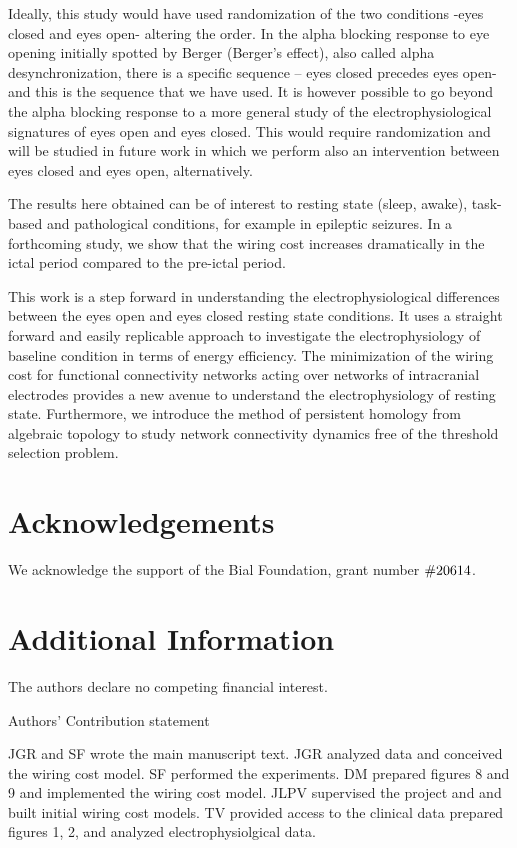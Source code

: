 \documentclass[11pt, onecolumn]{article}
\begin{document}
Ideally, this study would have used randomization of the two conditions -eyes closed and eyes open- altering the order. In the alpha blocking response to eye opening initially spotted by Berger (Berger’s effect), also called alpha desynchronization, there is a specific sequence – eyes closed precedes eyes open- and this is the sequence that we have used.
It is however possible to go beyond the alpha blocking response to a more general study of the electrophysiological signatures of eyes open and eyes closed. This would require randomization and will be studied in future work in which we perform also an intervention between eyes closed and eyes open, alternatively.

The results here obtained can be of interest to resting state (sleep, awake), task-based and pathological conditions, for example in epileptic seizures. In a forthcoming study, we show that the wiring cost increases dramatically in the ictal period compared to the pre-ictal period.   

This work is a step forward in understanding the electrophysiological differences between the eyes open and eyes closed resting state conditions. It uses a straight forward and easily replicable approach to investigate the electrophysiology of baseline condition in terms of energy efficiency. The minimization of the wiring cost for functional connectivity networks acting over networks of intracranial electrodes provides a new avenue to understand the electrophysiology of resting state. Furthermore, we introduce the method of persistent homology from algebraic topology to study network connectivity dynamics free of the threshold selection problem.


\section*{Acknowledgements}
We acknowledge the support of the Bial Foundation, grant number  $\#206\/14$.
\section*{Additional Information}
The authors declare no competing financial interest.

%




Authors' Contribution statement

JGR and SF wrote the main manuscript text. JGR analyzed data and conceived the wiring cost model. SF performed the experiments. DM prepared figures 8 and 9 and implemented the wiring cost model. JLPV supervised the project and and built initial wiring cost models. TV provided access to the clinical data prepared figures 1, 2, and analyzed electrophysiolgical data.
\end{document}
